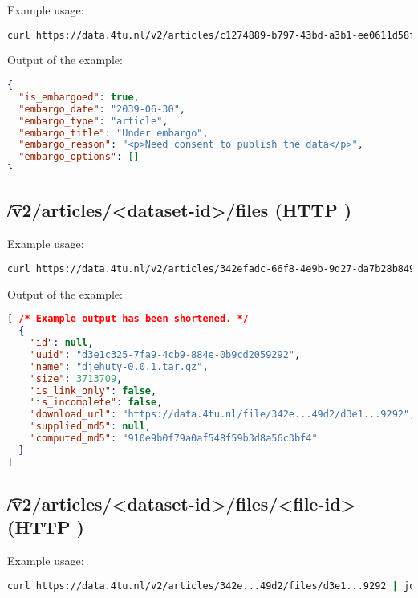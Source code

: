   Example usage:
\begin{lstlisting}[language=bash]
curl https://data.4tu.nl/v2/articles/c1274889-b797-43bd-a3b1-ee0611d58fd7/versions/2/embargo | jq
\end{lstlisting}

  Output of the example:
\begin{lstlisting}[language=JSON]
{
  "is_embargoed": true,
  "embargo_date": "2039-06-30",
  "embargo_type": "article",
  "embargo_title": "Under embargo",
  "embargo_reason": "<p>Need consent to publish the data</p>",
  "embargo_options": []
}
\end{lstlisting}


\subsection{\t{/v2/articles/<dataset-id>/files} (HTTP )}


  Example usage:
\begin{lstlisting}[language=bash]
curl https://data.4tu.nl/v2/articles/342efadc-66f8-4e9b-9d27-da7b28b849d2/files
\end{lstlisting}

  Output of the example:
\begin{lstlisting}[language=JSON]
[ /* Example output has been shortened. */
  {
    "id": null,
    "uuid": "d3e1c325-7fa9-4cb9-884e-0b9cd2059292",
    "name": "djehuty-0.0.1.tar.gz",
    "size": 3713709,
    "is_link_only": false,
    "is_incomplete": false,
    "download_url": "https://data.4tu.nl/file/342e...49d2/d3e1...9292",
    "supplied_md5": null,
    "computed_md5": "910e9b0f79a0af548f59b3d8a56c3bf4"
  }
]
\end{lstlisting}

\subsection{\t{/v2/articles/<dataset-id>/files/<file-id>} (HTTP )}

  Example usage:
\begin{lstlisting}[language=bash]
curl https://data.4tu.nl/v2/articles/342e...49d2/files/d3e1...9292 | jq
\end{lstlisting}

